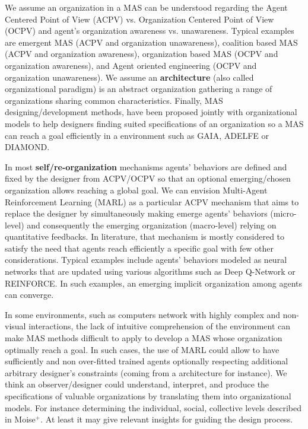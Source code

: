 \documentclass[conference]{IEEEtran}
\begin{document}
We assume an organization in a MAS can be understood regarding the Agent Centered Point of View (ACPV) vs. Organization Centered Point of View (OCPV) and agent's organization awareness vs. unawareness\cite{Picard2009}. Typical examples are emergent MAS (ACPV and organization unawareness), coalition based MAS (ACPV and organization awareness), organization based MAS (OCPV and organization awareness), and Agent oriented engineering (OCPV and organization unawareness)\cite{Picard2009}.
We assume an \textbf{architecture} (also called organizational paradigm) is an abstract organization gathering a range of organizations sharing common characteristics\cite{Horling2004}. Finally, MAS designing/development methods, have been proposed jointly with organizational models to help designers finding suited specifications of an organization so a MAS can reach a goal efficiently in a environment such as GAIA\cite{Wooldridge2000}, ADELFE\cite{Bernon2003} or DIAMOND\cite{Jamont2005}.

In most \textbf{self/re-organization} mechanisms agents' behaviors are defined and fixed by the designer from ACPV/OCPV so that an optional emerging/chosen organization allows reaching a global goal\cite{Picard2009}. We can envision Multi-Agent Reinforcement Learning (MARL) as a particular ACPV mechanism that aims to replace the designer by simultaneously making emerge agents' behaviors (micro-level) and consequently the emerging organization (macro-level) relying on quantitative feedbacks. In literature, that mechanism is mostly considered to satisfy the need that agents reach efficiently a specific goal with few other considerations. Typical examples include agents' behaviors modeled as neural networks that are updated using various algorithms such as Deep Q-Network or REINFORCE. In such examples, an emerging implicit organization among agents can converge.

In some environments, such as computers network with highly complex and non-visual interactions, the lack of intuitive comprehension of the environment can make MAS methods difficult to apply to develop a MAS whose organization optimally reach a goal. In such cases, the use of MARL could allow to have sufficiently and non over-fitted trained agents optionally respecting additional arbitrary designer's constraints (coming from a architecture for instance). We think an observer/designer could understand, interpret, and produce the specifications of valuable organizations by translating them into organizational models. For instance determining the individual, social, collective levels described in Moise$^+$\cite{Hubner2002}. At least it may give relevant insights for guiding the design process.
\end{document}
